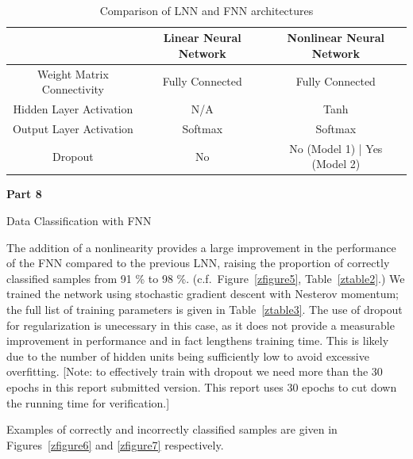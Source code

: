\documentclass{article}
\begin{document}
\noindent \\
\begin{table}[H]
\begin{center}
 \caption[width=7in]{Comparison of LNN and FNN architectures}
 \label{ztable1}
 \begin{tabular}{c c c}
 \toprule
      & Linear Neural Network & Nonlinear Neural Network \\ [0.5ex]
 \midrule
 Weight Matrix Connectivity & Fully Connected & Fully Connected  \\
 Hidden Layer Activation & N/A & Tanh  \\
  Output Layer Activation & Softmax & Softmax  \\
Dropout & No & No (Model 1) | Yes (Model 2) \\
 \bottomrule
\end{tabular}
\end{center}
 \end{table}



\pagebreak
\begin{center}
\textbf{Part 8 }
\end{center}


\begin{biomathg}
\noindent Data Classification with FNN
\end{biomathg}
\vspace{0.5cm}
The addition of a nonlinearity provides a large improvement in the performance of the FNN compared to the previous LNN, raising the proportion of correctly classified samples from 91 \% to 98 \%. (c.f.\ Figure~\ref{zfigure5}, Table~\ref{ztable2}.) We trained the network using stochastic gradient descent with Nesterov momentum; the full list of training parameters is given in Table~\ref{ztable3}. The use of dropout for regularization is unecessary in this case, as it does not provide a measurable improvement in performance and in fact lengthens training time. This is likely due to the number of hidden units being sufficiently low to avoid excessive overfitting. [Note: to effectively train with dropout we need more than the 30 epochs in this report submitted version. This report uses 30 epochs to cut down the running time for verification.]

Examples of correctly and incorrectly classified samples are given in Figures~\ref{zfigure6} and \ref{zfigure7} respectively.
\end{document}
